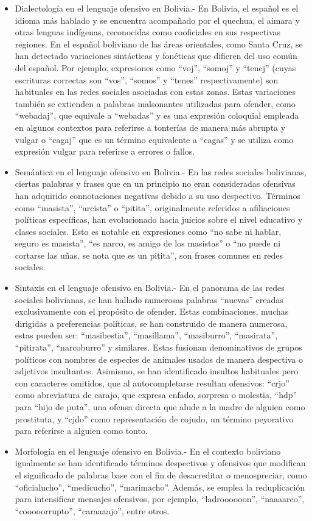 \begin{itemize}
	\item Dialectología en el lenguaje ofensivo en Bolivia.- En Bolivia, el español es el idioma más hablado y se encuentra acompañado por el quechua, el aimara y otras lenguas indígenas, reconocidas como cooficiales en sus respectivas regiones. En el español boliviano de las áreas orientales, como Santa Cruz, se han detectado variaciones sintácticas y fonéticas que difieren del uso común del español. Por ejemplo, expresiones como ``voj'', ``somoj'' y ``tenej'' (cuyas escrituras correctas son ``vos'', ``somos'' y ``tenes'' respectivamente) son habituales en las redes sociales asociadas con estas zonas. Estas variaciones también se extienden a palabras malsonantes utilizadas para ofender, como ``webadaj'', que equivale a ``webadas'' y es una expresión coloquial empleada en algunos contextos para referirse a tonterías de manera más abrupta y vulgar o ``cagaj'' que es un término equivalente a ``cagas'' y se utiliza como expresión vulgar para referirse a errores o fallos.
	
	\item Semántica en el lenguaje ofensivo en Bolivia.- En las redes sociales bolivianas, ciertas palabras y frases que en un principio no eran consideradas ofensivas han adquirido connotaciones negativas debido a su uso despectivo. Términos como ``masista'', ``arcista'' o ``pitita'', originalmente referidos a afiliaciones políticas específicas, han evolucionado hacia juicios sobre el nivel educativo y clases sociales. Esto es notable en expresiones como ``no sabe ni hablar, seguro es masista'', ``es narco, es amigo de los masistas'' o ``no puede ni cortarse las uñas, se nota que es un pitita'', son frases comunes en redes sociales.

	\item Sintaxis en el lenguaje ofensivo en Bolivia.- En el panorama de las redes sociales bolivianas, se han hallado numerosas palabras ``nuevas'' creadas exclusivamente con el propósito de ofender. Estas combinaciones, muchas dirigidas a preferencias políticas, se han construido de manera numerosa, estas pueden ser: ``masibestia'', ``masillama'', ``masiburro'', ``masirata'', ``pitirata'', ``narcoburro'' y similares. Estas fusionan denominativos de grupos políticos con nombres de especies de animales usados de manera despectiva o adjetivos insultantes. Asimismo, se han identificado insultos habituales pero con caracteres omitidos, que al autocompletarse resultan ofensivos: ``crjo'' como abreviatura de carajo, que expresa enfado, sorpresa o molestia, ``hdp'' para ``hijo de puta'', una ofensa directa que alude a la madre de alguien como prostituta, y ``cjdo'' como representación de cojudo, un término peyorativo para referirse a alguien como tonto.
	
	\item Morfología en el lenguaje ofensivo en Bolivia.- En el contexto boliviano igualmente se han identificado términos despectivos y ofensivos que modifican el significado de palabras base con el fin de desacreditar o menospreciar, como ``oficialucho'', ``medicucho'', ``marimacho''. Además, se emplea la reduplicación para intensificar mensajes ofensivos, por ejemplo, ``ladroooooon'', ``naaaarco'', ``cooooorrupto'', ``caraaaajo'', entre otros.
\end{itemize}